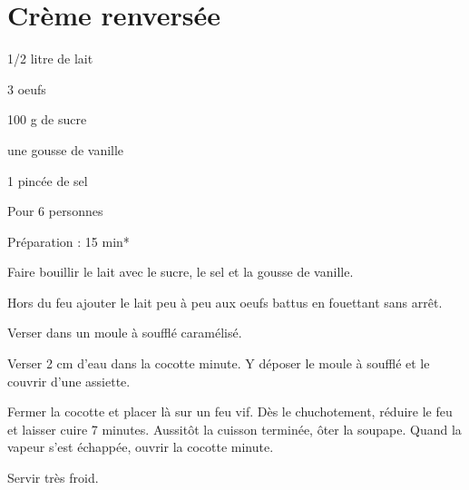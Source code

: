 \section{Crème renversée}

\begin{ingredients}
\item 1/2 litre de lait
\item 3 oeufs
\item 100 g de sucre
\item une gousse de vanille
\item 1 pincée de sel
\end{ingredients}
\begin{infos}
\item Pour 6 personnes		%
\item Préparation : 15 min*		%
\end{infos}
\begin{etapes}
\item Faire bouillir le lait avec le sucre, le sel et la gousse de vanille.
\item Hors du feu ajouter le lait peu à peu aux oeufs battus en fouettant sans arrêt.
\item Verser dans un moule à soufflé caramélisé.
\item Verser 2 cm d'eau dans la cocotte minute. Y déposer le moule à soufflé et le couvrir d'une assiette.
\item Fermer la cocotte et placer là sur un feu vif. Dès le chuchotement, réduire le feu et laisser cuire 7 minutes. Aussitôt la cuisson terminée, ôter la soupape. Quand la vapeur s'est échappée, ouvrir la cocotte minute.
\end{etapes}
\begin{conseils}
Servir très froid.
\end{conseils}

